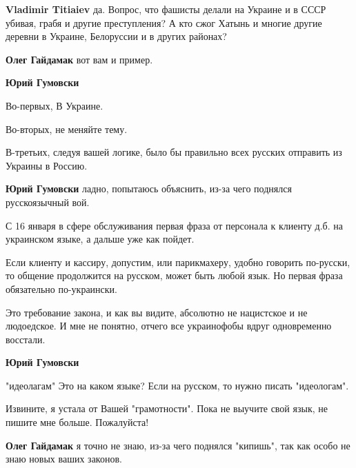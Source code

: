 \begin{itemize}
\textbf{Vladimir Titiaiev} да. Вопрос, что фашисты делали на Украине и в СССР убивая, грабя и другие преступления? А кто сжог Хатынь и многие другие деревни в Украине, Белоруссии и в других районах?



\textbf{Олег Гайдамак} вот вам и пример.


\textbf{Юрий Гумовски} 

Во-первых, В Украине. 

Во-вторых, не меняйте тему.

В-третьих, следуя вашей логике, было бы правильно всех русских отправить из
Украины в Россию.


\textbf{Юрий Гумовски} ладно, попытаюсь объяснить, из-за чего поднялся русскоязычный вой.

С 16 января в сфере обслуживания первая фраза от персонала к клиенту д.б. на
украинском языке, а дальше уже как пойдет.

Если клиенту и кассиру, допустим, или парикмахеру, удобно говорить по-русски,
то общение продолжится на русском, может быть любой язык. Но первая фраза
обязательно по-украински.

Это требование закона, и как вы видите, абсолютно не нацистское и не
людоедское. И мне не понятно, отчего все украинофобы вдруг одновременно
восстали.



\textbf{Юрий Гумовски} 

"идеолагам" Это на каком языке? Если на русском, то нужно писать "идеологам". 

Извините, я устала от Вашей "грамотности". Пока не выучите свой язык, не пишите
мне больше. Пожалуйста!


\textbf{Олег Гайдамак} я точно не знаю, из-за чего поднялся "кипишь", так как особо не знаю новых ваших законов.


\end{itemize}
